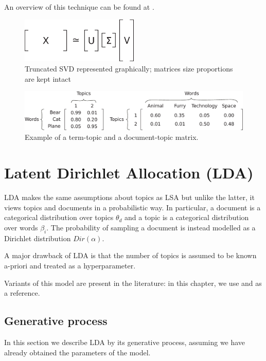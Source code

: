 An overview of this technique can be found at \cite{doi:10.1002/aris.1440380105}.

\begin{figure}[h]
    \centering
    \includegraphics[width=0.5\textwidth]{images/svd.eps}
    \caption{Truncated SVD represented graphically; matrices size proportions are kept intact}
    \label{fig:svd}
\end{figure}

\begin{figure}[h]
    \centering
    \includegraphics[width=\textwidth]{images/topic-mat.eps}
    \caption{Example of a term-topic and a document-topic matrix.}
    \label{fig:topicmat}
\end{figure}

\section{Latent Dirichlet Allocation (LDA)}
LDA makes the same assumptions about topics as LSA but unlike the latter, it views topics and documents in a probabilistic way.
In particular, a document is a categorical distribution over topics $\theta_d$ and a topic is a categorical distribution over words $\beta_i$.
The probability of sampling a document is instead modelled as a Dirichlet distribution $Dir(\alpha)$.

A major drawback of LDA is that the number of topics is assumed to be known a-priori and treated as a hyperparameter.

Variants of this model are present in the literature: in this chapter, we use \cite{10.1145/2107736.2107741} and \cite{DBLP:journals/jmlr/BleiNJ03} as a reference.

\subsection{Generative process} \label{gp}
In this section we describe LDA by its generative process, assuming we have already obtained the parameters of the model.

